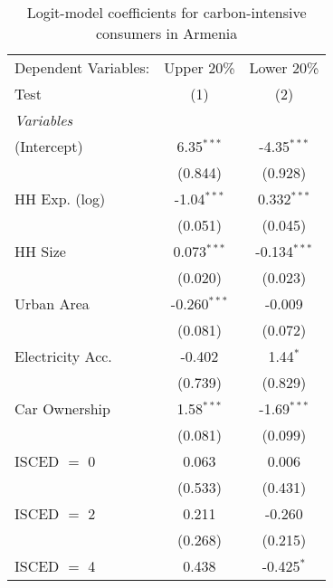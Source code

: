 
\begin{table}[htbp!]
   \centering
   \small
   \begin{adjustbox}{width = 1\textwidth, max height = 0.95\textheight, center}
      \begin{threeparttable}[b]
         \caption{\label{tab:Logit_1_ARM} Logit-model coefficients for carbon-intensive consumers in Armenia}
         \begin{tabular}{lcc}
            \tabularnewline \midrule \midrule
            Dependent Variables: & Upper 20\%     & Lower 20\%\\   
            Test                 & (1)            & (2)\\  
            \midrule
            \emph{Variables}\\
            (Intercept)          & 6.35$^{***}$   & -4.35$^{***}$\\   
                                 & (0.844)        & (0.928)\\   
            HH Exp. (log)        & -1.04$^{***}$  & 0.332$^{***}$\\   
                                 & (0.051)        & (0.045)\\   
            HH Size              & 0.073$^{***}$  & -0.134$^{***}$\\   
                                 & (0.020)        & (0.023)\\   
            Urban Area           & -0.260$^{***}$ & -0.009\\   
                                 & (0.081)        & (0.072)\\   
            Electricity Acc.     & -0.402         & 1.44$^{*}$\\   
                                 & (0.739)        & (0.829)\\   
            Car Ownership        & 1.58$^{***}$   & -1.69$^{***}$\\   
                                 & (0.081)        & (0.099)\\   
            ISCED $=$ 0          & 0.063          & 0.006\\   
                                 & (0.533)        & (0.431)\\   
            ISCED $=$ 2          & 0.211          & -0.260\\   
                                 & (0.268)        & (0.215)\\   
            ISCED $=$ 4          & 0.438          & -0.425$^{*}$\\   

\end{tabular}
\end{threeparttable}
\end{adjustbox}
\end{table}
